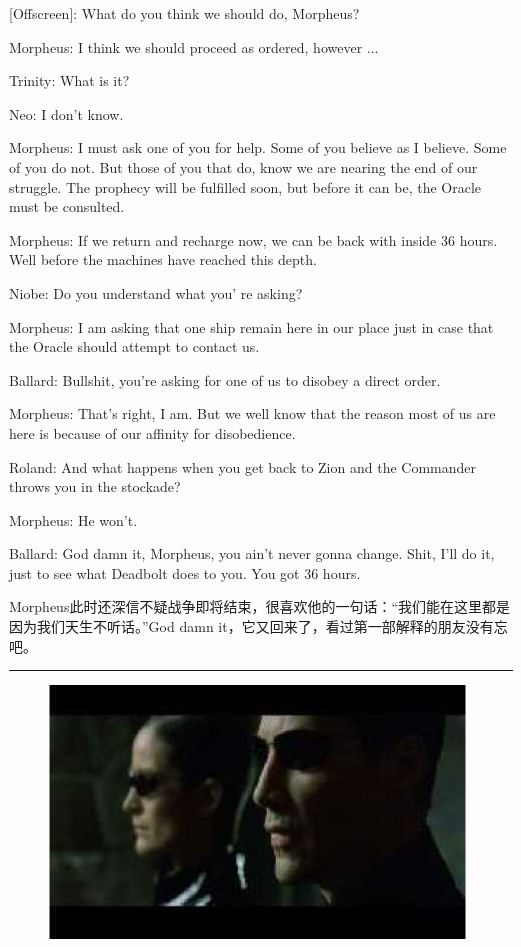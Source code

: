 \documentclass[UTF8]{ctexart}
\newcommand{\myparsep}{\noindent \rule[0.5ex]{\linewidth}{1pt}}
\newenvironment{myquote}{\color{green} \setlength{\leftskip}{6em} \setlength{\rightskip}{4em} \setlength{\parindent}{-2em}}{\par}
\begin{document}
\begin{myquote}
[Offscreen]: What do you think we should do, Morpheus?

Morpheus: I think we should proceed as ordered, however ...

Trinity: What is it?

Neo: I don't know.

Morpheus: I must ask one of you for help. Some of you believe as I believe. Some of you do not. But those of you that do, know we are nearing the end of our struggle. The prophecy will be fulfilled soon, but before it can be, the Oracle must be consulted.

Morpheus: If we return and recharge now, we can be back with inside 36 hours. Well before the machines have reached this depth.

Niobe: Do you understand what you' re asking?

Morpheus: I am asking that one ship remain here in our place just in case that the Oracle should attempt to contact us.

Ballard: Bullshit, you're asking for one of us to disobey a direct order.

Morpheus: That's right, I am. But we well know that the reason most of us are here is because of our affinity for disobedience.

Roland: And what happens when you get back to Zion and the Commander throws you in the stockade?

Morpheus: He won't.

Ballard: God damn it, Morpheus, you ain't never gonna change. Shit, I'll do it, just to see what Deadbolt does to you. You got 36 hours.
\end{myquote}

Morpheus此时还深信不疑战争即将结束，很喜欢他的一句话：“我们能在这里都是因为我们天生不听话。”God damn it，它又回来了，看过第一部解释的朋友没有忘吧。

\myparsep

\begin{figure}[htb]
\centering
\includegraphics[width=0.5\linewidth]{fig/read_reloaded-17}
\end{figure}
\end{document}
